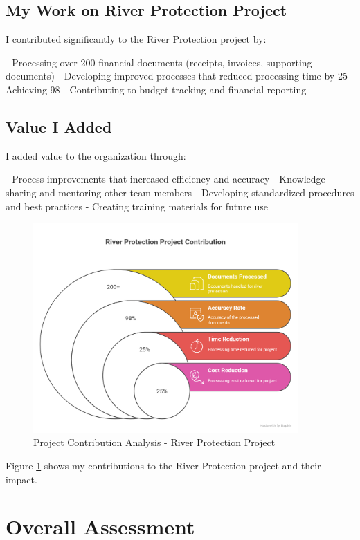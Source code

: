\subsection{My Work on River Protection Project}
I contributed significantly to the River Protection project by:

- Processing over 200 financial documents (receipts, invoices, supporting documents)
- Developing improved processes that reduced processing time by 25%
- Achieving 98%
- Contributing to budget tracking and financial reporting

\subsection{Value I Added}
I added value to the organization through:

- Process improvements that increased efficiency and accuracy
- Knowledge sharing and mentoring other team members
- Developing standardized procedures and best practices
- Creating training materials for future use

\begin{figure}[H]
    \centering
    \includegraphics[width=0.9\textwidth]{assets/images/project_contribution_chart.png}
    \caption{Project Contribution Analysis - River Protection Project}
    \label{fig:project_contribution_chart}
\end{figure}

Figure \ref{fig:project_contribution_chart} shows my contributions to the River Protection project and their impact.

\section{Overall Assessment}


